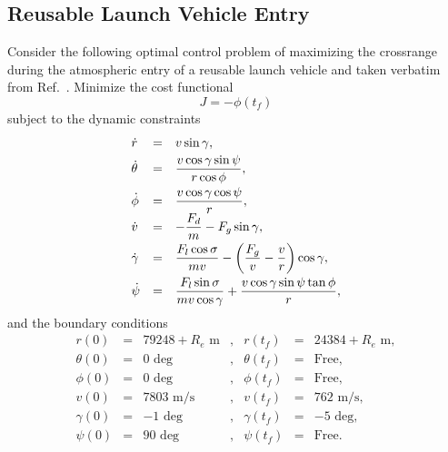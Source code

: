 \documentclass[10pt]{article}
\begin{document}
\clearpage

\subsection{Reusable Launch Vehicle Entry}

Consider the following optimal control problem of maximizing the
crossrange during the atmospheric entry of a reusable  launch
vehicle and taken verbatim from Ref.~\cite{Betts3}.  Minimize the cost
functional
\begin{equation}\label{rlv cost}
  J = -\phi(t_f) 
\end{equation}
subject to the dynamic constraints
\begin{equation}\label{rlv eom}
  \begin{array}{lclclclcl}
    \dot{r} & = & v \sin \gamma, \vspace{3pt} \\ 
    \dot{\theta} & = & \displaystyle \frac{v \cos \gamma \sin \psi}{r \cos
      \phi},  \vspace{3pt} \\ 
    \dot{\phi} & = & \displaystyle \frac{v \cos \gamma \cos \psi}{r}, \\ 
    \dot{v} & = & \displaystyle -\frac{F_d}{m}-F_g\sin \gamma, \vspace{3pt} \\ 
    \dot{\gamma} & = & \displaystyle \frac{F_l \cos \sigma}{ m v} -\left(\frac{F_g}{v}-\frac{v}{r}\right)\cos\gamma , \vspace{3pt} \\ 
    \dot{\psi}  & = & \displaystyle \frac{F_l \sin \sigma}{m v \cos \gamma}+\frac{v \cos \gamma \sin \psi \tan \phi }{r},  
  \end{array}
\end{equation}
and the boundary conditions
\begin{equation} \label{rlv bcs}
  \begin{array}{lclclcl}
    r(0) & = & 79248+R_e \textrm{ m} & , & r(t_f) & = & 24384+R_e \textrm{ m}, \\
    \theta(0) & = & 0 \textrm{ deg} & , & \theta(t_f) & = & \textrm{Free}, \\
    \phi(0) & = & 0 \textrm{ deg} & , & \phi(t_f) & = & \textrm{Free},  \\
    v(0) & = & 7803 \textrm{ m/s} & , & v(t_f) & = & 762 \textrm{ m/s}, \\
    \gamma(0) & = & -1 \textrm{ deg} & , & \gamma(t_f) & = & -5 \textrm{ deg},
 \\    \psi(0) & = & 90 \textrm{ deg} & , & \psi(t_f) & = & \textrm{Free}. \\
  \end{array}
\end{equation}
\end{document}
